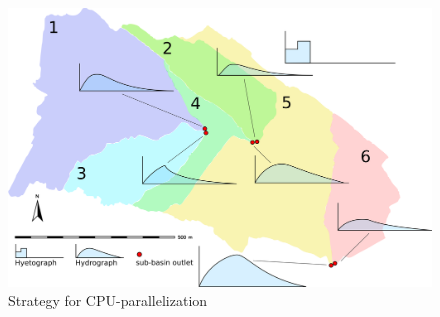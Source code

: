 \begin{figure}[ht!]
  \begin{center}
    \includegraphics[width=1.0\columnwidth]{figures/smoderp-cpu-parallel.png}
    \caption{Strategy for CPU-parallelization}
    \label{fig:cpu-parallel}
  \end{center}
\end{figure}




